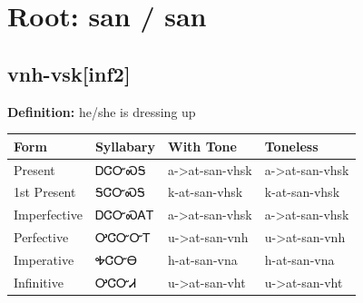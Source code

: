 \documentclass{article}%
\begin{document}
%
\normalsize%
\section*{Root: san / san}%
\subsection*{vnh-vsk[inf2]}%
\textbf{Definition: }%
he/she is dressing up%
\\[0.5em]%
\begin{tabular}{|l|l|l|l|}%
\hline%
\textbf{Form}&\textbf{Syllabary}&\textbf{With Tone}&\textbf{Toneless}\\%
\hline%
Present&ᎠᏣᏅᏍᎦ&a{-}>at{-}san{-}vhsk&a{-}>at{-}san{-}vhsk\\%
1st Present&ᎦᏣᏅᏍᎦ&k{-}at{-}san{-}vhsk&k{-}at{-}san{-}vhsk\\%
Imperfective&ᎠᏣᏅᏍᎪᎢ&a{-}>at{-}san{-}vhsk&a{-}>at{-}san{-}vhsk\\%
Perfective&ᎤᏣᏅᏅᎢ&u{-}>at{-}san{-}vnh&u{-}>at{-}san{-}vnh\\%
Imperative&ᎭᏣᏅᎾ&h{-}at{-}san{-}vna&h{-}at{-}san{-}vna\\%
Infinitive&ᎤᏣᏅᏗ&u{-}>at{-}san{-}vht&u{-}>at{-}san{-}vht\\%
\hline%
\end{tabular}%
\\[1em]%
\end{document}
